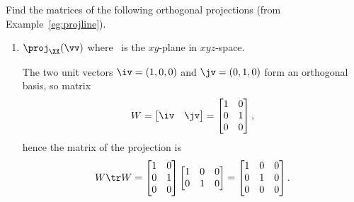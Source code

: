 \begin{example} \label{eg:}
Find the matrices of the following orthogonal projections (from Example~\ref{eg:projline}).
\begin{enumerate}
\item \(\proj_\XX(\vv)\) where \XX\ is the \(xy\)-plane in \(xyz\)-space.
\begin{solution} 
The two unit vectors \(\iv=(1,0,0)\) and \(\jv=(0,1,0)\) form an orthogonal basis, so matrix
\begin{equation*}
W=\begin{bmatrix} \iv&\jv \end{bmatrix}
=\begin{bmatrix} 1&0\\0&1\\0&0 \end{bmatrix},
\end{equation*}
hence the matrix of the projection is
\begin{equation*}
W\tr W=\begin{bmatrix} 1&0\\0&1\\0&0 \end{bmatrix}
\begin{bmatrix} 1&0&0\\0&1&0 \end{bmatrix}
=\begin{bmatrix} 1&0&0\\0&1&0\\0&0&0 \end{bmatrix}.
\end{equation*}
\end{solution}


\end{enumerate}
\end{example}
